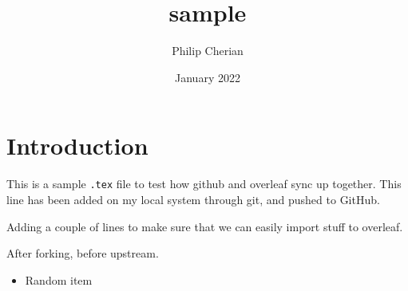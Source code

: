 \documentclass{article}
\title{sample}
\author{Philip Cherian}
\date{January 2022}
\begin{document}
\maketitle

\section{Introduction}

This is a sample \texttt{.tex} file to test how github and overleaf sync up together. This line has been added on my local system through git, and pushed to GitHub.

Adding a couple of lines to make sure that we can easily import stuff to overleaf.

After forking, before upstream.

\begin{itemize}
\item Random item
\end{itemize}
\end{document}
